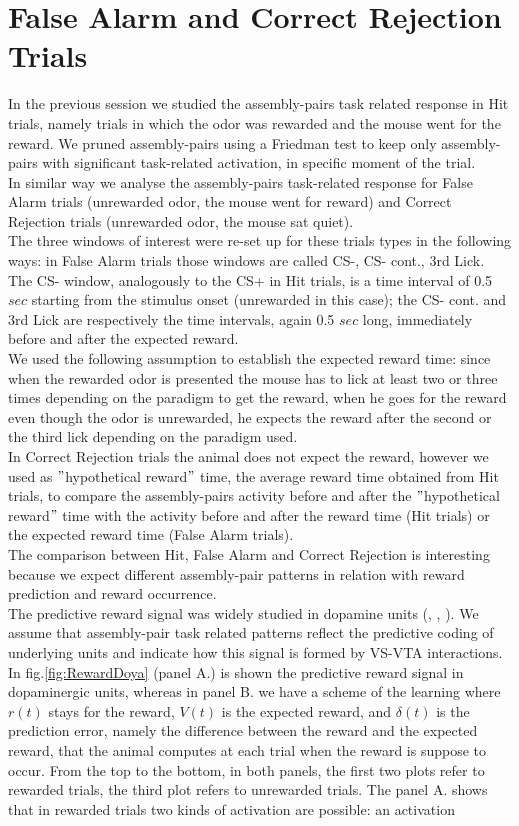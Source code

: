 \section{False Alarm and Correct Rejection Trials}
In the previous session we studied the assembly-pairs task related response in Hit trials, namely trials in which the odor was rewarded and the mouse went for the reward. We pruned assembly-pairs using a Friedman test to keep only assembly-pairs with significant task-related activation, in specific moment of the trial.\\In similar way we analyse the assembly-pairs task-related response for False Alarm trials (unrewarded odor, the mouse went for reward) and Correct Rejection trials (unrewarded odor, the mouse sat quiet).\\The three windows of interest were re-set up for these trials types in the following ways: in False Alarm trials those windows are called CS-, CS- cont., 3rd Lick. The CS- window, analogously to the CS+ in Hit trials, is a time interval of 0.5 $sec$ starting from the stimulus onset (unrewarded in this case); the CS- cont. and 3rd Lick are respectively the time intervals, again 0.5 $sec$ long, immediately before and after the expected reward.\\We used the following assumption to establish the expected reward time: since when the rewarded odor is presented the mouse has to lick at least two or three times depending on the paradigm to get the reward, when he goes for the reward even though the odor is unrewarded, he expects the reward after the second or the third lick depending on the paradigm used.\\In Correct Rejection trials the animal does not expect the reward, however we used as $"$hypothetical reward$"$ time, the average reward time obtained from Hit trials, to compare the assembly-pairs activity before and after the $"$hypothetical reward$"$ time with the activity before and after the reward time (Hit trials) or the expected reward time (False Alarm trials).\\The comparison between Hit, False Alarm and Correct Rejection is interesting because we expect different assembly-pair patterns in relation with reward prediction and reward occurrence.\\The predictive reward signal was widely studied in dopamine units (\cite{Schultz1998}, \cite{Schultz2001}, \cite{Doya}). We assume that assembly-pair task related patterns reflect the predictive coding of underlying units and indicate how this signal is formed by VS-VTA interactions.\\In fig.\ref{fig:RewardDoya} (panel A.) is shown the predictive reward signal in dopaminergic units, whereas in panel B. we have a scheme of the learning where $r(t)$ stays for the reward, $V(t)$ is the expected reward, and $\delta(t)$ is the prediction error, namely the difference between the reward and the expected reward, that the animal computes at each trial when the reward is suppose to occur. From the top to the bottom, in both panels, the first two plots refer to rewarded trials, the third plot refers to unrewarded trials. The panel A. shows that in rewarded trials two kinds of activation are possible: an activation 